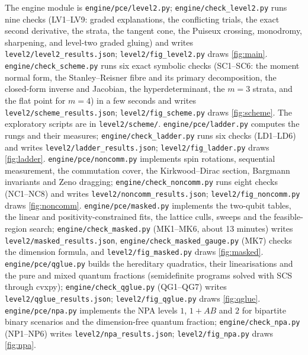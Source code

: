 \documentclass[11pt]{article}
\theoremstyle{definition}\newtheorem{definition}[theorem]{Definition}\newtheorem{remark}[theorem]{Remark}\newtheorem{example}[theorem]{Example}
\begin{document}
The engine module is \texttt{engine/pce/level2.py}; \texttt{engine/check\_level2.py} runs nine checks (LV1--LV9: graded explanations,
the conflicting trials, the exact second derivative, the strata, the tangent cone, the Puiseux crossing, monodromy, sharpening, and level-two graded gluing) and
writes \texttt{level2/level2\_results.json}; \texttt{level2/fig\_level2.py} draws \cref{fig:main}. \texttt{engine/check\_scheme.py}
runs six exact symbolic checks (SC1--SC6: the moment normal form, the Stanley--Reisner fibre and its primary decomposition, the closed-form
inverse and Jacobian, the hyperdeterminant, the $m=3$ strata, and the flat point for $m=4$) in a few seconds and writes
\texttt{level2/scheme\_results.json}; \texttt{level2/fig\_scheme.py} draws \cref{fig:scheme}. The exploratory scripts are in
\texttt{level2/scheme/}. \texttt{engine/pce/ladder.py} computes the rungs and their measures; \texttt{engine/check\_ladder.py} runs six
checks (LD1--LD6) and writes \texttt{level2/ladder\_results.json}; \texttt{level2/fig\_ladder.py} draws \cref{fig:ladder}.
\texttt{engine/pce/noncomm.py} implements spin rotations, sequential measurement, the commutation cover, the Kirkwood--Dirac section,
Bargmann invariants and Zeno dragging; \texttt{engine/check\_noncomm.py} runs eight checks (NC1--NC8) and writes
\texttt{level2/noncomm\_results.json}; \texttt{level2/fig\_noncomm.py} draws \cref{fig:noncomm}.
\texttt{engine/pce/masked.py} implements the two-qubit tables, the linear and positivity-constrained fits, the lattice culls, sweeps and
the feasible-region search; \texttt{engine/check\_masked.py} (MK1--MK6, about 13 minutes) writes \texttt{level2/masked\_results.json},
\texttt{engine/check\_masked\_gauge.py} (MK7) checks the dimension formula, and \texttt{level2/fig\_masked.py} draws \cref{fig:masked}.
\texttt{engine/pce/qglue.py} builds the hereditary quadratics, their linearisations and the pure and mixed quantum fractions (semidefinite
programs solved with SCS through cvxpy); \texttt{engine/check\_qglue.py} (QG1--QG7) writes \texttt{level2/qglue\_results.json};
\texttt{level2/fig\_qglue.py} draws \cref{fig:qglue}.
\texttt{engine/pce/npa.py} implements the NPA levels $1$, $1{+}AB$ and $2$ for bipartite binary scenarios and the dimension-free quantum
fraction; \texttt{engine/check\_npa.py} (NP1--NP6) writes \texttt{level2/npa\_results.json}; \texttt{level2/fig\_npa.py} draws \cref{fig:npa}.
\end{document}
